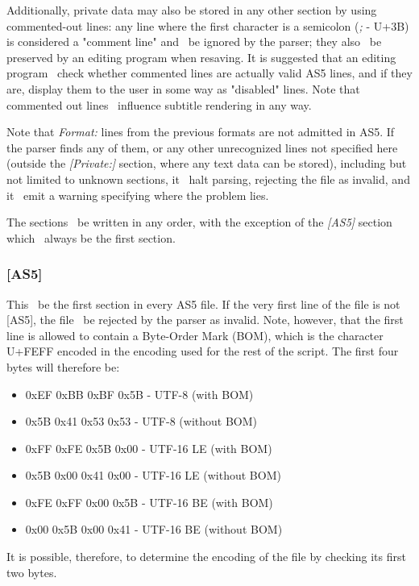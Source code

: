 \documentclass{spec}
\begin{document}
Additionally, private data may also be stored in any other section by using commented-out
lines: any line where the first character is a semicolon (\textit{;} - U+3B) is considered a
"comment line" and \must\ be ignored by the parser; they also \must\ be preserved by an editing program
when resaving. It is suggested that an editing program \should\ check whether commented lines are
actually valid AS5 lines, and if they are, display them to the user in some way as "disabled" lines.
Note that commented out lines \mustnot\ influence subtitle rendering in any way.

Note that \emph{Format:} lines from the previous formats are not admitted in AS5. If the parser
finds any of them, or any other unrecognized lines not specified here (outside the \emph{[Private:]}
section, where any text data can be stored), including but not limited to unknown sections, it
\must\ halt parsing, rejecting the file as invalid, and it \should\ emit a warning specifying
where the problem lies.

The sections \may\ be written in any order, with the exception of the \emph{[AS5]} section which
\must\ always be the first section.


\subsubsection{[AS5]}
This \must\ be the first section in every AS5 file. If the very first line of the file is not
[AS5], the file \must\ be rejected by the parser as invalid. Note, however, that the first
line is allowed to contain a Byte-Order Mark (BOM), which is the character U+FEFF encoded in
the encoding used for the rest of the script\cite{Unicode BOM}. The first four bytes will therefore be:

\begin{itemize}
\item 0xEF 0xBB 0xBF 0x5B - UTF-8 (with BOM)
\item 0x5B 0x41 0x53 0x53 - UTF-8 (without BOM)
\item 0xFF 0xFE 0x5B 0x00 - UTF-16 LE (with BOM)
\item 0x5B 0x00 0x41 0x00 - UTF-16 LE (without BOM)
\item 0xFE 0xFF 0x00 0x5B - UTF-16 BE (with BOM)
\item 0x00 0x5B 0x00 0x41 - UTF-16 BE (without BOM)
\end{itemize}

It is possible, therefore, to determine the encoding of the file by checking its first two bytes.
\end{document}
